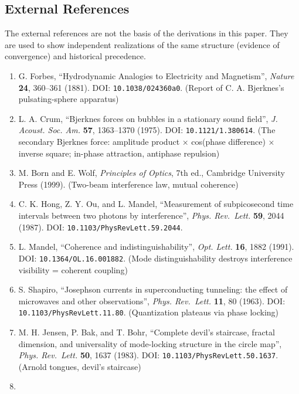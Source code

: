 \documentclass[
  a4paper,
]{article}
\providecommand{\tightlist}{%
  \setlength{\itemsep}{0pt}\setlength{\parskip}{0pt}}
\begin{document}
\subsection{External References}\label{external-references}

The external references are not the basis of the derivations in this
paper. They are used to show independent realizations of the same
structure (evidence of convergence) and historical precedence.

\begin{enumerate}
\def\labelenumi{\arabic{enumi}.}
\setcounter{enumi}{6}
\tightlist
\item
  G. Forbes, ``Hydrodynamic Analogies to Electricity and Magnetism'',
  \emph{Nature} \textbf{24}, 360--361 (1881). DOI:
  \texttt{10.1038/024360a0}. (Report of C. A. Bjerknes's
  pulsating-sphere apparatus)
\item
  L. A. Crum, ``Bjerknes forces on bubbles in a stationary sound
  field'', \emph{J. Acoust. Soc. Am.} \textbf{57}, 1363--1370 (1975).
  DOI: \texttt{10.1121/1.380614}. (The secondary Bjerknes force:
  amplitude product × cos(phase difference) × inverse square; in-phase
  attraction, antiphase repulsion)
\item
  M. Born and E. Wolf, \emph{Principles of Optics}, 7th ed., Cambridge
  University Press (1999). (Two-beam interference law, mutual coherence)
\item
  C. K. Hong, Z. Y. Ou, and L. Mandel, ``Measurement of subpicosecond
  time intervals between two photons by interference'', \emph{Phys.
  Rev.~Lett.} \textbf{59}, 2044 (1987). DOI:
  \texttt{10.1103/PhysRevLett.59.2044}.
\item
  L. Mandel, ``Coherence and indistinguishability'', \emph{Opt. Lett.}
  \textbf{16}, 1882 (1991). DOI: \texttt{10.1364/OL.16.001882}. (Mode
  distinguishability destroys interference visibility = coherent
  coupling)
\item
  S. Shapiro, ``Josephson currents in superconducting tunneling: the
  effect of microwaves and other observations'', \emph{Phys. Rev.~Lett.}
  \textbf{11}, 80 (1963). DOI: \texttt{10.1103/PhysRevLett.11.80}.
  (Quantization plateaus via phase locking)
\item
  M. H. Jensen, P. Bak, and T. Bohr, ``Complete devil's staircase,
  fractal dimension, and universality of mode-locking structure in the
  circle map'', \emph{Phys. Rev.~Lett.} \textbf{50}, 1637 (1983). DOI:
  \texttt{10.1103/PhysRevLett.50.1637}. (Arnold tongues, devil's
  staircase)
\item

\end{enumerate}
\end{document}
